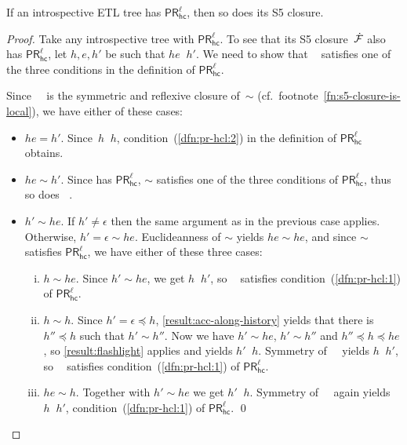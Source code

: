 \documentclass{article}
\newcommand{\PRhcl}{\ensuremath{\mathsf{PR_{hc}^\ell}}\xspace}
\newcommand{\FSfive}{\dot\F}
\newcommand{\acc}{\sim}
\DeclareMathOperator{\accSfive}{\dot\acc}
\newcounter{#1}
\newcommand{\qedhere}{\qed}
\begin{document}
\begin{lemma}
  \label{result:pr-hcl-preserved-under-s5-closure}
  If an introspective ETL tree has \PRhcl, then so does its S5 closure.
\end{lemma}
\begin{proof}
  Take any introspective tree \F with \PRhcl.
  To see that its S5 closure~$\FSfive$ also has \PRhcl, let $h,e,h'$ be such that $he\accSfive h'$.
  We need to show that $\accSfive$ satisfies one of the three conditions in the definition of \PRhcl.

  Since~$\accSfive$ is the symmetric and reflexive closure of~$\acc$
  (cf.~footnote~\ref{fn:s5-closure-is-local}),
  we have either of these cases:
  \begin{itemize}
  \item $he=h'$.
    Since~$h\accSfive h$, condition~(\ref{dfn:pr-hcl:2}) in the definition of \PRhcl obtains.
  \item $he\acc h'$.
    Since \F has \PRhcl, $\acc$ satisfies one of the three conditions of \PRhcl, thus so does $\accSfive$.
  \item $h'\acc he$.
    If $h'\neq\epsilon$ then the same argument as in the previous case applies.
    Otherwise, $h'=\epsilon\acc he$.
    Euclideanness of $\acc$ yields $he\acc he$,
    and since $\acc$ satisfies \PRhcl, we have either of these three cases:
    \begin{enumerate}[(i)]
    \item $h\acc he$.
      Since $h'\acc he$, we get $h\accSfive h'$,
      so $\accSfive$ satisfies condition~(\ref{dfn:pr-hcl:1}) of \PRhcl.
    \item $h\acc h$.
      Since $h'=\epsilon\preceq h$,
      \cref{result:acc-along-history} yields that there is $h''\preceq h$
      such that $h'\acc h''$.
      Now we have $h'\acc he$, $h'\acc h''$ and $h''\preceq h\preceq he$,
      so \cref{result:flashlight} applies and yields $h'\accSfive h$.
      Symmetry of~$\accSfive$ yields $h\accSfive h'$,
      so $\accSfive$ satisfies condition~(\ref{dfn:pr-hcl:1}) of \PRhcl.
    \item $he\acc h$.
      Together with $h'\acc he$ we get $h'\accSfive h$.
      Symmetry of~$\accSfive$ again yields $h\accSfive h'$,
      condition~(\ref{dfn:pr-hcl:1}) of \PRhcl. \qedhere
    \end{enumerate}
  \end{itemize}
\end{proof}
\end{document}
